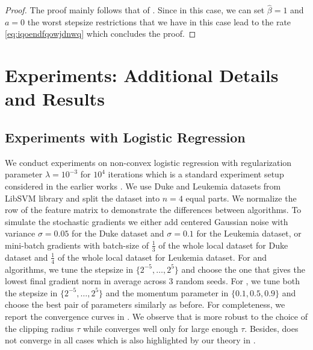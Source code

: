 \documentclass[a4paper,11pt]{article}
\begin{document}
\begin{proof}
    The proof mainly follows that of . Since in this case, we can set $\hat{\beta} =1$ and $a=0$ the worst stepsize restrictions that we have in this case lead to the rate \eqref{eq:iqoendfqowjdnwq} which concludes the proof.
    
\end{proof}


\section{Experiments: Additional Details and Results}\label{sec:appendix_exp}



\subsection{Experiments with Logistic Regression}\label{sec:stoch_setting_appendix}



We conduct experiments on non-convex logistic regression with regularization parameter $\lambda=10^{-3}$ for $10^4$ iterations which is a standard experiment setup considered in the earlier works \citep{gao2024econtrol, islamov2024asgrad, makarenko2022adaptive}. We use Duke and Leukemia datasets from LibSVM library and split the dataset into $n=4$ equal parts. We normalize the row of the feature matrix to demonstrate the differences between algorithms. To simulate the stochastic gradients we either add centered Gaussian noise with variance $\sigma = 0.05$ for the Duke dataset and $\sigma=0.1$ for the Leukemia dataset, or mini-batch gradients with batch-size of $\frac{1}{3}$ of the whole local dataset for Duke dataset and $\frac{1}{4}$ of the whole local dataset for Leukemia dataset. For  and  algorithms, we tune the stepsize in $\{2^{-5},\dots,2^5\}$ and choose the one that gives the lowest final gradient norm in average across $3$ random seeds. For , we tune both the stepsize in $\{2^{-5}, \dots, 2^5\}$ and the momentum parameter in $\{0.1, 0.5, 0.9\}$ and choose the best pair of parameters similarly as before. For completeness, we report the convergence curves in . We observe that  is more robust to the choice of the clipping radius $\tau$ while  converges well only for large enough $\tau$. Besides,  does not converge in all cases which is also highlighted by our theory in .
\end{document}
